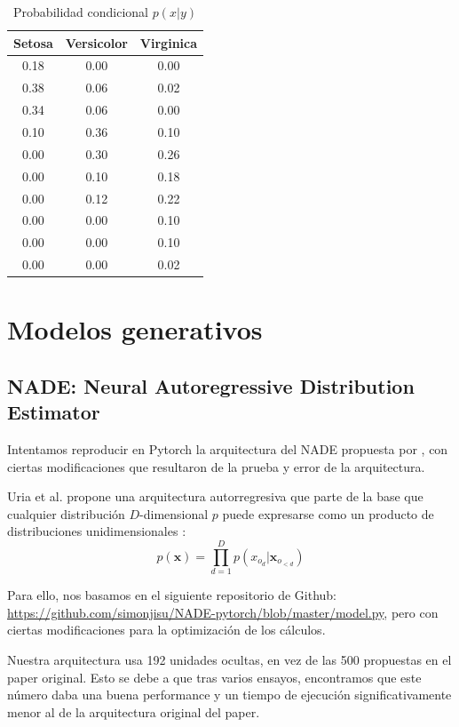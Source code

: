 \documentclass[11pt]{article}
\begin{document}
\begin{table}[h]
\centering
\begin{tabular}{c|c|c}
\textbf{Setosa}                   & \textbf{Versicolor}               &  \textbf{Virginica} \\ \hline \hline
        0.18& 0.00& 0.00\\
        0.38& 0.06& 0.02\\
        0.34& 0.06& 0.00\\
        0.10& 0.36& 0.10\\
        0.00& 0.30& 0.26\\
        0.00& 0.10& 0.18\\
        0.00& 0.12& 0.22\\
        0.00& 0.00& 0.10\\
        0.00& 0.00& 0.10\\
        0.00& 0.00& 0.02\\
    \end{tabular}
    \caption{Probabilidad condicional $p(x|y)$}
    \label{tab:my_label}
\end{table}

\newpage

\section{Modelos generativos}
\subsection{NADE: Neural Autoregressive Distribution Estimator}

Intentamos reproducir en Pytorch la arquitectura del NADE propuesta por \cite{nade}, con ciertas modificaciones que resultaron de la prueba y error de la arquitectura.

Uria et al. propone una arquitectura autorregresiva que parte de la base que cualquier distribución $D$-dimensional $p$ puede expresarse como un producto de distribuciones unidimensionales \cite{nade}:
$$
p(\boldsymbol{x}) = \prod_{d=1}^{D}p(x_{o_d} | \boldsymbol{x}_{o_{<d}})
$$

Para ello, nos basamos en el siguiente repositorio de Github: \url{https://github.com/simonjisu/NADE-pytorch/blob/master/model.py}, pero con ciertas modificaciones para la optimización de los cálculos.

Nuestra arquitectura usa 192 unidades ocultas, en vez de las 500 propuestas en el paper original. Esto se debe a que tras varios ensayos, encontramos que este número daba una buena performance y un tiempo de ejecución significativamente menor al de la arquitectura original del paper. 
\end{document}
